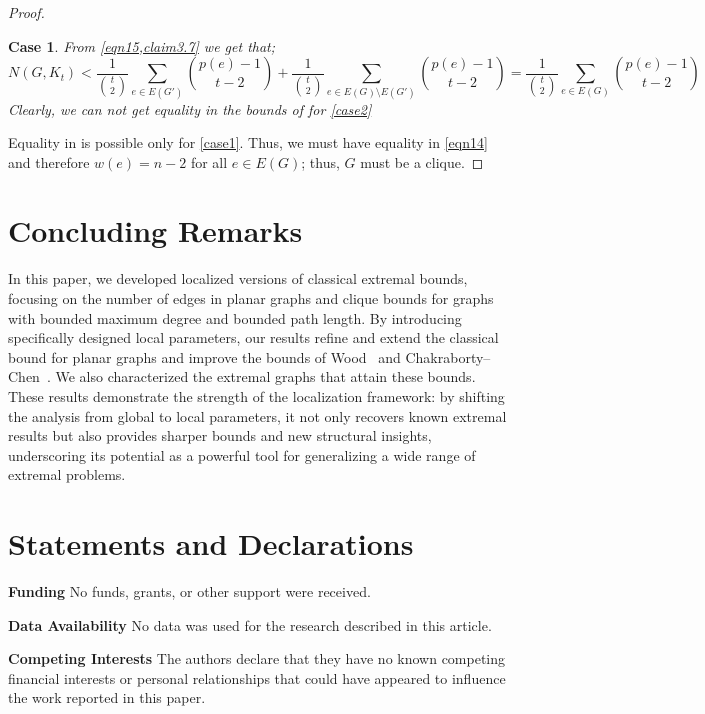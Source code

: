 \documentclass[pdflatex,sn-basic,Numbered]{sn-jnl}
\newtheorem{case}{Case}
\begin{document}
\begin{proof}
\begin{case}
    From \cref{eqn15,claim3.7} we get that;
    \begin{equation*}
        N(G,K_t) < \frac{1}{{t\choose 2}}\sum_{e \in E(G')}{p(e)-1 \choose t-2} + \frac{1}{{t\choose 2}}\sum_{e \in E(G) \setminus E(G')}{{p(e)-1\choose t-2}} = \frac{1}{{t\choose 2}}\sum_{e \in E(G)}{{p(e)-1\choose t-2}} 
    \end{equation*}
    Clearly, we can not get equality in the bounds of  for \cref{case2}
    \end{case}
   
Equality in  is possible only for \cref{case1}. Thus, we must have equality in \cref{eqn14} and therefore $w(e) =n-2$ for all $e \in E(G)$; thus, $G$ must be a clique. 
  \end{proof}

 \section{Concluding Remarks}\label{end}
In this paper, we developed localized versions of classical extremal bounds, focusing on the number of edges in planar graphs and clique bounds for graphs with bounded maximum degree and bounded path length. By introducing specifically designed local parameters, our results refine and extend the classical bound for planar graphs and improve the bounds of Wood~\cite{wood} and Chakraborty--Chen~\cite{CHAKRABORTI2024103955}. We also characterized the extremal graphs that attain these bounds. These results demonstrate the strength of the localization framework: by shifting the analysis from global to local parameters, it not only recovers known extremal results but also provides sharper bounds and new structural insights, underscoring its potential as a powerful tool for generalizing a wide range of extremal problems.






\section*{Statements and Declarations}

\noindent\textbf{Funding} No funds, grants, or other support were received.


\noindent\textbf{Data Availability} No data was used for the research described in this article.


\noindent\textbf{Competing Interests} The authors declare that they have no known competing financial interests
or personal relationships that could have appeared to influence the work
reported in this paper.



\end{document}
